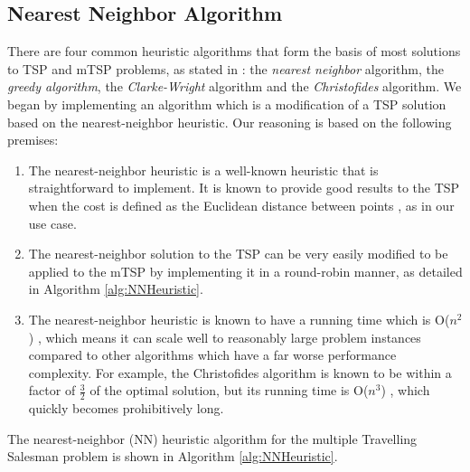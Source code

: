 \subsection{Nearest Neighbor Algorithm}
There are four common heuristic algorithms that form the basis of most solutions to TSP and mTSP problems, as stated in \cite{Johnson1997TheOptimization}: the \textit{nearest neighbor} algorithm, the \textit{greedy algorithm}, the \textit{Clarke-Wright} algorithm and the \textit{Christofides} algorithm. We began by implementing an algorithm which is a modification of a TSP solution based on the nearest-neighbor heuristic. Our reasoning is based on the following premises:
\begin{enumerate}
    \item The nearest-neighbor heuristic is a well-known heuristic that is straightforward to implement. It is known to provide good results to the TSP when the cost is defined as the Euclidean distance between points \cite{Johnson1995TheOptimization}, as in our use case.
    \item The nearest-neighbor solution to the TSP can be very easily modified to be applied to the mTSP by implementing it in a round-robin manner, as detailed in Algorithm \ref{alg:NNHeuristic}.
    \item The nearest-neighbor heuristic is known to have a running time which is O($n^2$) \cite{Rosenkrantz1977AnProblem}, which means it can scale well to reasonably large problem instances compared to other algorithms which have a far worse performance complexity. For example, the Christofides algorithm is known to be within a factor of $\frac{3}{2}$ of the optimal solution, but its running time is O($n^3$) \cite{Christofides1976WORST-CASEPROBLEM}, which quickly becomes prohibitively long.
\end{enumerate}

The nearest-neighbor (NN) heuristic algorithm for the multiple Travelling Salesman problem is shown in Algorithm \ref{alg:NNHeuristic}.



